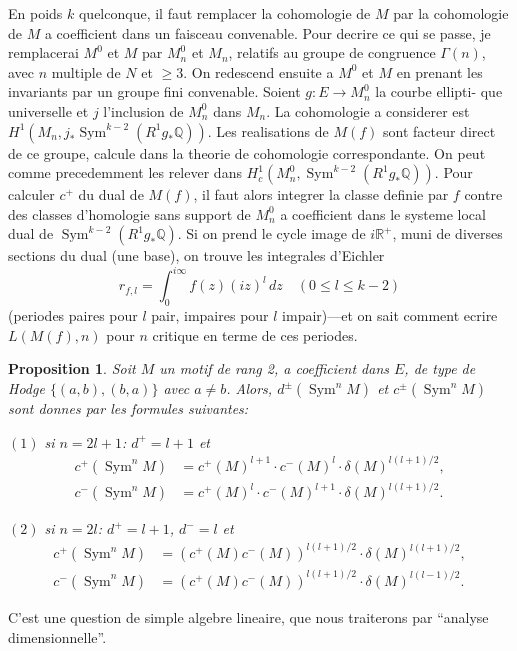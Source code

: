 \documentclass[12pt,a4paper]{article}
\theoremstyle{plain}
\newtheorem{proposition}[theorem]{Proposition}
\theoremstyle{definition}
\theoremstyle{remark}
\DeclareMathOperator{\Sym}{Sym}
\newcommand{\Q}{\mathbb{Q}}
\newcommand{\R}{\mathbb{R}}
\begin{document}
En poids $k$ quelconque, il faut remplacer la cohomologie de $M$ par la cohomologie
de $M$ a coefficient dans un faisceau convenable. Pour decrire ce qui se passe, je
remplacerai $M^0$ et $M$ par $M^0_n$ et $M_n$, relatifs au groupe de congruence
$\Gamma(n)$, avec $n$ multiple de $N$ et $\geq 3$. On redescend ensuite a $M^0$ et $M$ en prenant
les invariants par un groupe fini convenable. Soient $g: E \to M^0_n$ la courbe ellipti-
que universelle et $j$ l'inclusion de $M^0_n$ dans $M_n$. La cohomologie a considerer est
$H^1(M_n, j_* \Sym^{k-2}(R^1 g_* \Q))$. Les realisations de $M(f)$ sont facteur direct de ce
groupe, calcule dans la theorie de cohomologie correspondante. On peut comme
precedemment les relever dans $H^1_c(M^0_n, \Sym^{k-2}(R^1 g_* \Q))$. Pour calculer $c^+$ du
dual de $M(f)$, il faut alors integrer la classe definie par $f$ contre des classes
d'homologie sans support de $M^0_n$ a coefficient dans le systeme local dual de
$\Sym^{k-2}(R^1 g_* \Q)$. Si on prend le cycle image de $i\R^+$, muni de diverses sections
du dual (une base), on trouve les integrales d'Eichler
\[
r_{f,l} = \int_0^{i\infty} f(z) (iz)^l \, dz \quad (0 \leq l \leq k-2)
\]
(periodes paires pour $l$ pair, impaires pour $l$ impair)---et on sait comment ecrire
$L(M(f), n)$ pour $n$ critique en terme de ces periodes.

\begin{proposition}\label{prop:7.7}
Soit $M$ un motif de rang 2, a coefficient dans $E$, de type de Hodge
$\{(a,b), (b,a)\}$ avec $a \neq b$. Alors, $d^\pm(\Sym^n M)$ et $c^\pm(\Sym^n M)$ sont donnes
par les formules suivantes:

$(1)$ si $n = 2l+1$: $d^+ = l+1$ et
\begin{align*}
c^+(\Sym^n M) &= c^+(M)^{l+1} \cdot c^-(M)^l \cdot \delta(M)^{l(l+1)/2},\\
c^-(\Sym^n M) &= c^+(M)^l \cdot c^-(M)^{l+1} \cdot \delta(M)^{l(l+1)/2}.
\end{align*}

$(2)$ si $n = 2l$: $d^+ = l+1$, $d^- = l$ et
\begin{align*}
c^+(\Sym^n M) &= (c^+(M) c^-(M))^{l(l+1)/2} \cdot \delta(M)^{l(l+1)/2},\\
c^-(\Sym^n M) &= (c^+(M) c^-(M))^{l(l+1)/2} \cdot \delta(M)^{l(l-1)/2}.
\end{align*}
\end{proposition}

C'est une question de simple algebre lineaire, que nous traiterons par ``analyse
dimensionnelle''.
\end{document}
